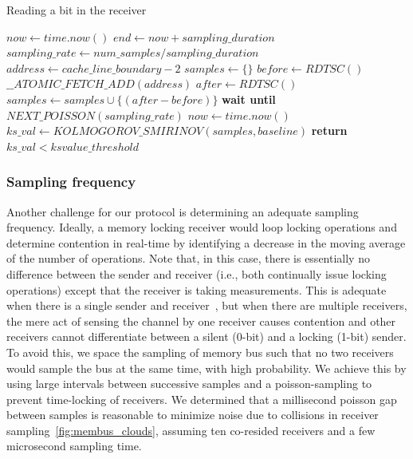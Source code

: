\begin{algorithm}[!t]
\caption{Reading a bit in the receiver}
\label{alg:receiver}
\begin{algorithmic}[1]
\STATE $now \leftarrow  time.now()$
\STATE $end \leftarrow now + sampling\_duration$
\STATE $sampling\_rate \leftarrow num\_samples / sampling\_duration$
\STATE $address \leftarrow cache\_line\_boundary-2$
\STATE $samples \leftarrow \{\} $
    \STATE $before \leftarrow RDTSC()$
    \STATE $\_\_ATOMIC\_FETCH\_ADD(address)$
    \STATE $after \leftarrow RDTSC()$
    \STATE $samples \leftarrow samples \cup \{(after-before)\}$
    \STATE \textbf{wait until} $NEXT\_POISSON(sampling\_rate)$
    \STATE $now \leftarrow  time.now()$
\ENDWHILE
\STATE $ks\_val \leftarrow KOLMOGOROV\_SMIRINOV(samples, baseline)$
\STATE \textbf{return} $ks\_val < ksvalue\_threshold$
\end{algorithmic}
\end{algorithm}


\subsubsection{Sampling frequency}
Another challenge for our protocol is determining an adequate sampling
frequency. Ideally, a memory locking receiver would loop locking operations and
determine contention in real-time by identifying a decrease in the moving
average of the number of operations. Note that, in this case, there is
essentially no difference between the sender and receiver (i.e., both
continually issue locking operations) except that the receiver is taking
measurements. This is adequate when there is a single sender and
receiver~\cite{varadarajan2015}, but when there are multiple receivers, the mere
act of sensing the channel by one receiver causes contention and other receivers
cannot differentiate between a silent (0-bit) and a locking (1-bit) sender. To
avoid this, we space the sampling of memory bus such that no two receivers would
sample the bus at the same time, with high probability.  We achieve this by
using large intervals between successive samples and a poisson-sampling to
prevent time-locking of receivers. We determined that a millisecond poisson gap
between samples is reasonable to minimize noise due to collisions in receiver
sampling~\ref{fig:membus_clouds}, assuming ten co-resided receivers and a few
microsecond sampling time.

